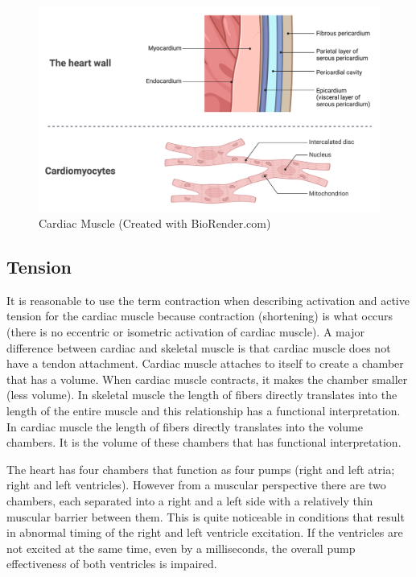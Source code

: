 \begin{figure}[!h]
    \centering
    \includegraphics[width=1\linewidth]{./figure/Cardiac_Muscle.png}
    \caption{Cardiac Muscle \footnotesize{(Created with BioRender.com)}}
    \label{fig:Cardiac_Muscle}
\end{figure}

\subsection{Tension}

It is reasonable to use the term contraction when describing activation and active tension for the cardiac muscle because contraction (shortening) is what occurs (there is no eccentric or isometric activation of cardiac muscle). A major difference between cardiac and skeletal muscle is that cardiac muscle does not have a tendon attachment. Cardiac muscle attaches to itself to create a chamber that has a volume. When cardiac muscle contracts, it makes the chamber smaller (less volume). In skeletal muscle the length of fibers directly translates into the length of the entire muscle and this relationship has a functional interpretation. In cardiac muscle the length of fibers directly translates into the volume chambers. It is the volume of these chambers that has functional interpretation. 

The heart has four chambers that function as four pumps (right and left atria; right and left ventricles). However from a muscular perspective there are two chambers, each separated into a right and a left side with a relatively thin muscular barrier between them. This is quite noticeable in conditions that result in abnormal timing of the right and left ventricle excitation. If the ventricles are not excited at the same time, even by a milliseconds, the overall pump effectiveness of both ventricles is impaired.

